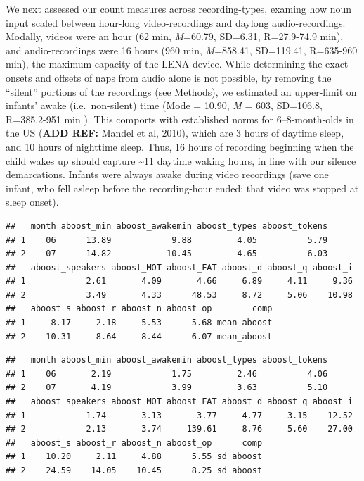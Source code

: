 \documentclass[floatsintext,man]{apa6}
\theoremstyle{definition}
\theoremstyle{definition}
\theoremstyle{definition}
\theoremstyle{remark}
\begin{document}
We next assessed our count measures across recording-types, examing how
noun input scaled between hour-long video-recordings and daylong
audio-recordings. Modally, videos were an hour (62 min, \emph{M}=60.79,
SD=6.31, R=27.9-74.9 min), and audio-recordings were 16 hours (960 min,
\emph{M}=858.41, SD=119.41, R=635-960 min), the maximum capacity of the
LENA device. While determining the exact onsets and offsets of naps from
audio alone is not possible, by removing the \enquote{silent} portions
of the recordings (see Methods), we estimated an upper-limit on infants'
awake (i.e.~non-silent) time (Mode = 10.90, \emph{M} = 603, SD=106.8,
R=385.2-951 min ). This comports with established norms for
6--8-month-olds in the US (\textbf{ADD REF:} Mandel et al, 2010), which
are 3 hours of daytime sleep, and 10 hours of nighttime sleep. Thus, 16
hours of recording beginning when the child wakes up should capture
\textasciitilde{}11 daytime waking hours, in line with our silence
demarcations. Infants were always awake during video recordings (save
one infant, who fell asleep before the recording-hour ended; that video
was stopped at sleep onset).

\begin{verbatim}
##   month aboost_min aboost_awakemin aboost_types aboost_tokens
## 1    06      13.89            9.88         4.05          5.79
## 2    07      14.82           10.45         4.65          6.03
##   aboost_speakers aboost_MOT aboost_FAT aboost_d aboost_q aboost_i
## 1            2.61       4.09       4.66     6.89     4.11     9.36
## 2            3.49       4.33      48.53     8.72     5.06    10.98
##   aboost_s aboost_r aboost_n aboost_op        comp
## 1     8.17     2.18     5.53      5.68 mean_aboost
## 2    10.31     8.64     8.44      6.07 mean_aboost
\end{verbatim}

\begin{verbatim}
##   month aboost_min aboost_awakemin aboost_types aboost_tokens
## 1    06       2.19            1.75         2.46          4.06
## 2    07       4.19            3.99         3.63          5.10
##   aboost_speakers aboost_MOT aboost_FAT aboost_d aboost_q aboost_i
## 1            1.74       3.13       3.77     4.77     3.15    12.52
## 2            2.13       3.74     139.61     8.76     5.60    27.00
##   aboost_s aboost_r aboost_n aboost_op      comp
## 1    10.20     2.11     4.88      5.55 sd_aboost
## 2    24.59    14.05    10.45      8.25 sd_aboost
\end{verbatim}
\end{document}

